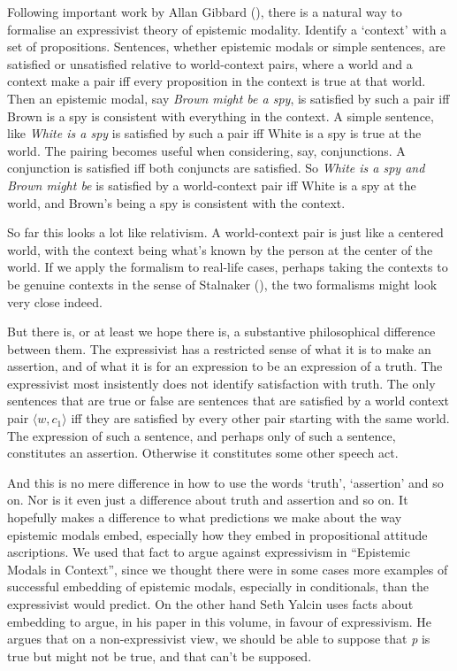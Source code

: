 \documentclass[
  10pt,
  letterpaper,
  DIV=11,
  numbers=noendperiod,
  twoside]{scrartcl}
\begin{document}
Following important work by Allan Gibbard
(), there is a natural way to formalise
an expressivist theory of epistemic modality. Identify a `context' with
a set of propositions. Sentences, whether epistemic modals or simple
sentences, are satisfied or unsatisfied relative to world-context pairs,
where a world and a context make a pair iff every proposition in the
context is true at that world. Then an epistemic modal, say \emph{Brown
might be a spy}, is satisfied by such a pair iff Brown is a spy is
consistent with everything in the context. A simple sentence, like
\emph{White is a spy} is satisfied by such a pair iff White is a spy is
true at the world. The pairing becomes useful when considering, say,
conjunctions. A conjunction is satisfied iff both conjuncts are
satisfied. So \emph{White is a spy and Brown might be} is satisfied by a
world-context pair iff White is a spy at the world, and Brown's being a
spy is consistent with the context.

So far this looks a lot like relativism. A world-context pair is just
like a centered world, with the context being what's known by the person
at the center of the world. If we apply the formalism to real-life
cases, perhaps taking the contexts to be genuine contexts in the sense
of Stalnaker (), the two formalisms
might look very close indeed.

But there is, or at least we hope there is, a substantive philosophical
difference between them. The expressivist has a restricted sense of what
it is to make an assertion, and of what it is for an expression to be an
expression of a truth. The expressivist most insistently does not
identify satisfaction with truth. The only sentences that are true or
false are sentences that are satisfied by a world context pair
\(\langle w,c_1 \rangle\) iff they are satisfied by every other pair
starting with the same world. The expression of such a sentence, and
perhaps only of such a sentence, constitutes an assertion. Otherwise it
constitutes some other speech act.

And this is no mere difference in how to use the words `truth',
`assertion' and so on. Nor is it even just a difference about truth and
assertion and so on. It hopefully makes a difference to what predictions
we make about the way epistemic modals embed, especially how they embed
in propositional attitude ascriptions. We used that fact to argue
against expressivism in ``Epistemic Modals in Context'', since we
thought there were in some cases more examples of successful embedding
of epistemic modals, especially in conditionals, than the expressivist
would predict. On the other hand Seth Yalcin uses facts about embedding
to argue, in his paper in this volume, in favour of expressivism. He
argues that on a non-expressivist view, we should be able to suppose
that \emph{p} is true but might not be true, and that can't be supposed.
\end{document}
